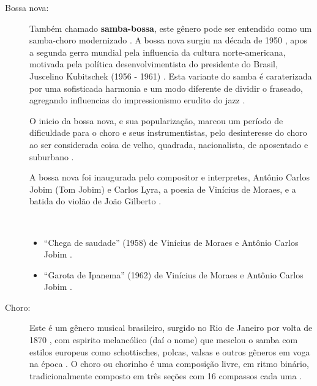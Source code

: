 \begin{description}


\item[Bossa nova:] 
Também chamado \textbf{samba-bossa}, este gênero pode ser entendido como um samba-choro modernizado \cite[pp. 63]{reinato2010musica}.
A bossa nova surgiu  na década de 1950 \cite[pp. 130]{perna2002samba},
apos a segunda gerra mundial pela influencia da cultura norte-americana, motivada 
pela política desenvolvimentista do presidente do Brasil, Juscelino Kubitschek (1956 - 1961) \cite[pp. 15]{de2003tem}.
Esta variante do samba é caraterizada por uma sofisticada harmonia e um modo diferente de dividir o fraseado, 
agregando influencias do impressionismo erudito do jazz  \cite[pp. 130]{perna2002samba} \cite[pp. 15]{de2003tem}. 

O inicio da bossa nova, e sua popularização, 
marcou um período de dificuldade para o choro e seus instrumentistas,
pelo desinteresse  do choro ao ser considerada coisa de velho, quadrada, nacionalista, de aposentado e suburbano \cite{rizzi2016musica}.

A bossa nova foi inaugurada pelo compositor e interpretes, Antônio Carlos Jobim (Tom Jobim) e Carlos Lyra,
a poesia de Vinícius de Moraes, e
a batida do violão de João Gilberto \cite[pp. 130]{perna2002samba}  \cite[pp. 15]{de2003tem}.
\begin{example} ~

\begin{itemize}
\item ``Chega de saudade'' (1958) de Vinícius de Moraes e Antônio Carlos Jobim \cite{castro2016chega} \cite{tomjobim}.
\item  ``Garota de Ipanema'' (1962) de Vinícius de Moraes e Antônio Carlos Jobim \cite{tomjobim}.
\end{itemize}
\end{example}

\item[Choro:] 
Este é um gênero musical brasileiro, surgido no Rio de Janeiro por volta de 1870 \cite[pp. 132]{perna2002samba} \cite[pp. 64]{reinato2010musica},
com espirito melancólico (daí o nome) que mesclou o samba com  estilos europeus como schottisches, polcas,
valsas e outros gêneros em voga na época  \cite[pp. 64]{reinato2010musica} \cite[pp. 79]{dourado2004dicionario} \cite[pp. 132]{perna2002samba}.
O choro ou chorinho é uma composição livre, em ritmo binário, 
tradicionalmente composto em três seções com 16 compassos cada uma \cite[pp. 64]{reinato2010musica}.


\end{description}
